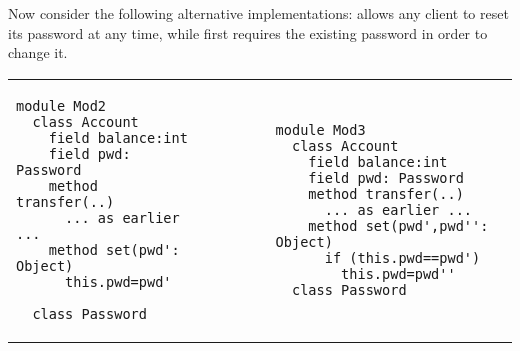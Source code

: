  

Now consider the following alternative implementations:
 allows any client to reset its password at any time, while
 first requires the existing password in order to change it.


  
%
  
  

\begin{tabular}{lll}
\begin{minipage}[b]{0.42\textwidth}
\begin{lstlisting}[language=chainmail, frame=lines]
module Mod2
  class Account
    field balance:int 
    field pwd: Password 
    method transfer(..) 
      ... as earlier ...
    method set(pwd': Object)
      this.pwd=pwd'
      
  class Password
\end{lstlisting}
\end{minipage}
&\ \ \  \ \   &%
\begin{minipage}[b]{0.45\textwidth}
\begin{lstlisting}[language=chainmail, frame=lines]
module Mod3
  class Account
    field balance:int 
    field pwd: Password 
    method transfer(..) 
      ... as earlier ...
    method set(pwd',pwd'': Object)
      if (this.pwd==pwd') 
        this.pwd=pwd''
  class Password
\end{lstlisting}
\end{minipage} 
\end{tabular}

